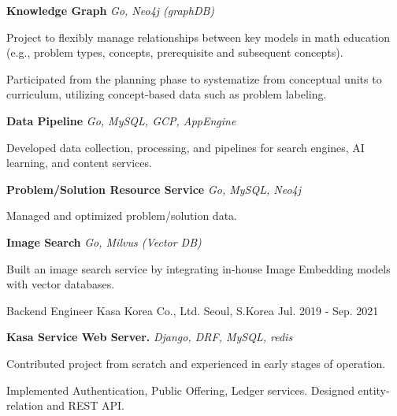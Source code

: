 \begin{cventries}
\cventry
  {} %
  {} %
  {} %
  {} %
  {
  \begin{cvsubentries}
    \begin{cvitems} %
      \item[] {\textbf{Knowledge Graph} \hspace{1cm} \textit{Go, Neo4j (graphDB)}}
      \item[] {Project to flexibly manage relationships between key models in math education (e.g., problem types, concepts, prerequisite and subsequent concepts).}
      \item {Participated from the planning phase to systematize from conceptual units to curriculum, utilizing concept-based data such as problem labeling.}
      \item[] 
      \item[] {\textbf{Data Pipeline} \hspace{1cm} \textit{Go, MySQL, GCP, AppEngine}}
      \item {Developed data collection, processing, and pipelines for search engines, AI learning, and content services.}
      \item[] 
      \item[] {\textbf{Problem/Solution Resource Service} \hspace{1cm} \textit{Go, MySQL, Neo4j}}
      \item {Managed and optimized problem/solution data.}
      \item[] 
      \item[] {\textbf{Image Search} \hspace{1cm} \textit{Go, Milvus (Vector DB)}}
      \item {Built an image search service by integrating in-house Image Embedding models with vector databases.}
      \item[]
    \end{cvitems}
  \end{cvsubentries}
  }

  \cventry
    {Backend Engineer} %
    {Kasa Korea Co., Ltd.} %
    {Seoul, S.Korea} %
    {Jul. 2019 - Sep. 2021} %
    {
      \begin{cvitems} %
        \item[] {\textbf{Kasa Service Web Server.} \hspace{1cm} \textit{Django, DRF, MySQL, redis}}
        \item {Contributed project from scratch and experienced in early stages of operation.}
        \item {Implemented Authentication, Public Offering, Ledger services. Designed entity-relation and REST API.}
        \item[]
      \end{cvitems}
    }


\end{cventries}
